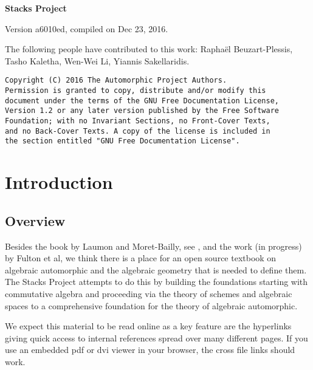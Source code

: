 \documentclass[oneside]{stacks-project-book}
\theoremstyle{plain}
\theoremstyle{definition}
\theoremstyle{remark}
\numberwithin{equation}{subsection}
\begin{document}
\newcommand{\TAG}{ZZZZ}
\begin{titlepage}
\pagestyle{empty}
\setcounter{page}{1}
\centerline{\LARGE\bfseries Stacks Project}
\vskip1in
\noindent
\centerline{
Version a6010ed, compiled on Dec 23, 2016.
}
\vskip1in
\noindent
The following people have contributed to this work:
Raphaël Beuzart-Plessis, Tasho Kaletha, Wen-Wei Li, Yiannis Sakellaridis.
\end{titlepage}
\begin{verbatim}
Copyright (C) 2016 The Automorphic Project Authors.
Permission is granted to copy, distribute and/or modify this
document under the terms of the GNU Free Documentation License,
Version 1.2 or any later version published by the Free Software
Foundation; with no Invariant Sections, no Front-Cover Texts,
and no Back-Cover Texts. A copy of the license is included in
the section entitled "GNU Free Documentation License".
\end{verbatim}
\tableofcontents

%

\chapter{Introduction}



\label{introduction-section-phantom}
\hypertarget{0000}{}
\reversemarginpar{}




\section{Overview}
\label{introduction-section-overview}
\hypertarget{0001}{}
\reversemarginpar{}

\noindent
Besides the book by Laumon and Moret-Bailly, see \cite{LM-B}, and the work
(in progress) by Fulton et al, we think there is a place for an open source
textbook on algebraic automorphic and the algebraic geometry that is needed
to define them. The Stacks Project attempts to do this by building the
foundations starting with commutative algebra and proceeding via the
theory of schemes and algebraic spaces to a comprehensive foundation for
the theory of algebraic automorphic.

\medskip\noindent
We expect this material to be read online as a key feature are the hyperlinks
giving quick access to internal references spread over many different pages.
If you use an embedded pdf or dvi viewer in your browser, the cross file
links should work.
\end{document}
